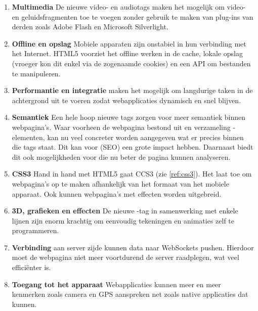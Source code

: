 \begin{enumerate}
\item \textbf{Multimedia} 
De nieuwe video- en audiotags maken het mogelijk om video- en geluidsfragmenten toe te voegen zonder gebruik te maken van plug-ins van derden zoals Adobe Flash en Microsoft Silverlight.

\item \textbf{Offline en opslag}  
Mobiele apparaten zijn onstabiel in hun verbinding met het Internet. HTML5 voorziet het offline werken in de cache, lokale opslag (vroeger kon dit enkel via de zogenaamde cookies) en een API om bestanden te manipuleren.

\item \textbf{Performantie en integratie}
 maken het mogelijk om langdurige \js{} taken in de achtergrond uit te voeren zodat webapplicaties dynamisch en snel blijven.

\item \textbf{Semantiek}
Een hele hoop nieuwe tags zorgen voor meer semantiek binnen webpagina's. 
Waar voorheen de webpagina bestond uit en verzameling -elementen, kan nu veel concreter worden aangegeven wat er precies binnen die tags staat. 
Dit kan voor  (SEO) een grote impact hebben. 
Daarnaast biedt dit ook mogelijkheden voor  die nu beter de pagina kunnen analyseren.

\item \textbf{CSS3}
Hand in hand met HTML5 gaat CCS3 (zie \ref{ref:css3}). 
Het laat toe om webpagina's op te maken afhankelijk van het formaat van het mobiele apparaat. 
Ook kunnen webpagina's met effecten worden uitgebreid. 

\item \textbf{3D, grafieken en effecten}
De nieuwe -tag in samenwerking met enkele lijnen \js{} zijn enorm krachtig om eenvoudig tekeningen en animaties zelf te programmeren.

\item \textbf{Verbinding}
 aan server zijde kunnen data naar WebSockets pushen. Hierdoor moet de webpagina niet meer voortdurend de server raadplegen, wat veel efficiënter is.

\item \textbf{Toegang tot het apparaat}
Webapplicaties kunnen meer en meer kenmerken zoals camera en GPS aanspreken net zoals native applicaties dat kunnen. 
\end{enumerate}

